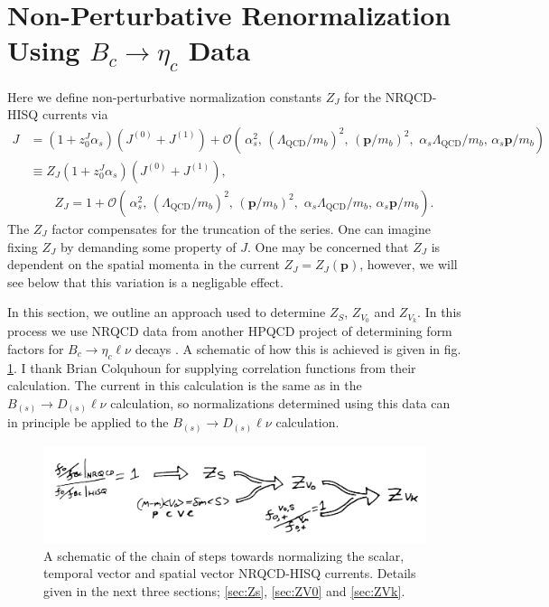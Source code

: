\section{Non-Perturbative Renormalization Using $B_c\to \eta_c$ Data}
\label{sec:Bcetac}

Here we define non-perturbative normalization constants $Z_J$ for the NRQCD-HISQ currents via 
\begin{align}
  \nonumber
	J &= ( 1 + z^J_0 \alpha_s )( J^{(0)} + J^{(1)} ) + \mathcal{O}(\, \alpha_s^2, \, (\Lambda_{\text{QCD}}/m_b)^2, \, ({\textbf{p}}/m_b)^2,\,\,\alpha_s \Lambda_{\text{QCD}} / m_b,\, \alpha_s {\textbf{p}}/m_b ) \\ \nonumber
	&\equiv Z_{J}( 1 + z^J_0 \alpha_s )( J^{(0)} + J^{(1)} ), \\  &\quad\quad Z_{J} = 1 +  \mathcal{O}(\, \alpha_s^2, \, (\Lambda_{\text{QCD}}/m_b)^2, \, ({\textbf{p}}/m_b)^2,\,\,\alpha_s \Lambda_{\text{QCD}} / m_b,\, \alpha_s {\textbf{p}}/m_b ).
	\label{eq:overall}
\end{align}
The $Z_J$ factor compensates for the truncation of the series. One can imagine fixing $Z_J$ by demanding some property of $J$. One may be concerned that $Z_J$ is dependent on the spatial momenta in the current $Z_J=Z_J({\textbf{p}})$, however, we will see below that this variation is a negligable effect.

In this section, we outline an approach used to determine $Z_S$, $Z_{V_0}$ and $Z_{V_k}$. In this process we use NRQCD data from another HPQCD project of determining form factors for $B_c \to \eta_c \ell\nu$ decays \cite{Colquhoun:2016osw}. A schematic of how this is achieved is given in fig. \ref{fig:normalization_chain}. I thank Brian Colquhoun for supplying correlation functions from their calculation. The current in this calculation is the same as in the $B_{(s)}\to D_{(s)}\ell\nu$ calculation, so normalizations determined using this data can in principle be applied to the $B_{(s)}\to D_{(s)}\ell\nu$ calculation.

\begin{figure}[htb!]
\hspace{-5pt}
    \includegraphics[width=1.0\textwidth]{images/nrqcd/normalization_chain.jpg}
  \caption{A schematic of the chain of steps towards normalizing the scalar, temporal vector and spatial vector NRQCD-HISQ currents. Details given in the next three sections; \ref{sec:Zs}, \ref{sec:ZV0} and \ref{sec:ZVk}. \label{fig:normalization_chain}}
\end{figure}

